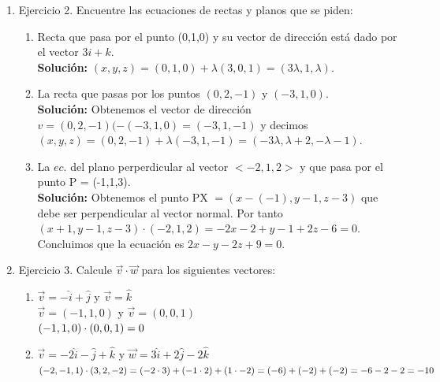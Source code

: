 \documentclass[10pt,letterpaper,fleqn]{article}
\begin{document}
\begin{enumerate}
        \item Ejercicio 2. Encuentre las ecuaciones de rectas y planos que se piden:
        \begin{enumerate}

          \item Recta que pasa por el punto (0,1,0) y su vector de dirección está dado por el vector $3i+k$.\\
          \textbf{Solución:} $(x,y,z) = (0,1,0) + \lambda(3,0,1)=(3\lambda,1,\lambda)$.

          \item La recta que pasas por los puntos $(0,2,-1)$ y $(-3,1,0)$.\\
          \textbf{Solución:} Obtenemos el vector de dirección $v=(0,2,-1)( - (-3,1,0) = (-3,1,-1)$ y decimos $(x,y,z)=(0,2,-1) + \lambda(-3,1,-1) = (-3\lambda,\lambda + 2, -\lambda-1)$.
          
                    \item La $ec.$ del plano perperdicular al vector $<-2,1,2>$ y que pasa por el punto P = (-1,1,3).\\
                    \textbf{Solución:} Obtenemos el punto PX $= (x-(-1),y-1,z-3)$ que debe ser perpendicular al vector normal. Por tanto $(x+1  ,y-1,z-3)\cdot(-2,1,2)=-2x-2 + y-1 + 2z - 6 = 0$. Concluimos que la ecuación es $2x-y-2z+9 = 0$.

        \end{enumerate}

        \item Ejercicio 3. Calcule $\overrightarrow{v} \cdot \overrightarrow{w}$
        para los siguientes vectores:
        \begin{enumerate}
          \item
          $\overrightarrow{v} = -\widehat{i}+\widehat{j}$ y
          $\overrightarrow{v} = \widehat{k}$ \\
            $\overrightarrow{v} = (-1,1,0)$ y
            $\overrightarrow{v} = (0,0,1)$ \\
            $
              (-1,1,0) \cdot (0,0,1) \\
              = 0
            $
            \\
          \item
          $\overrightarrow{v} = -2\widehat{i} -\widehat{j} + \widehat{k}$ y
          $\overrightarrow{w} = 3\widehat{i} + 2\widehat{j} -2\widehat{k}$
            $
              (-2,-1,1) \cdot (3,2,-2) \\
              = (-2\cdot 3) + (-1\cdot 2) + (1\cdot -2) \\
              = (-6) + (-2) + (-2) \\
              = - 6 - 2 - 2 \\
              = -10
            $
        \end{enumerate}


\end{enumerate}
\end{document}
